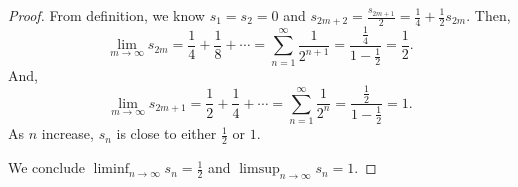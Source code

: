\begin{Exercise}
	\begin{proof}
		From definition, we know $s_1 = s_2 = 0$ and $s_{2m+2} = \frac{s_{2m+1}}{2} = \frac{1}{4} + \frac{1}{2}s_{2m}$. Then,
		$$
		\lim_{m\to\infty} s_{2m}
		= \frac{1}{4} + \frac{1}{8} + \cdots
		= \sum_{n=1}^{\infty} \frac{1}{2^{n+1}}
		= \frac{\frac{1}{4}}{1 - \frac{1}{2}}
		= \frac{1}{2}.
		$$
		And,
		$$
		\lim_{m\to\infty} s_{2m+1} 
		= \frac{1}{2} + \frac{1}{4} + \cdots
		= \sum_{n=1}^{\infty} \frac{1}{2^n}
		= \frac{\frac{1}{2}}{1 - \frac{1}{2}}
		= 1.
		$$
		As $n$ increase, $s_n$ is close to either $\frac{1}{2}$ or $1$.
		
		We conclude $\liminf_{n\to\infty} s_n = \frac{1}{2}$ and $\limsup_{n\to\infty} s_n = 1$.
	\end{proof}
\end{Exercise}